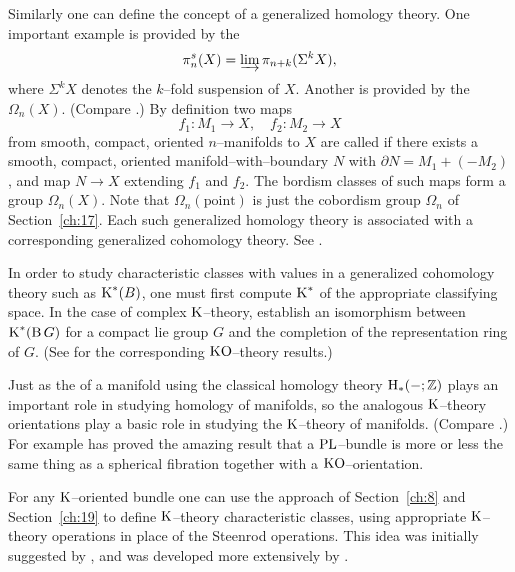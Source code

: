 \documentclass[../main]{subfiles}
\begin{document}
Similarly one can define the concept of a generalized homology theory. One important example is provided by the  \[\pi_n^s(X) = \varinjlim \pi_{n + k}(\Sigma^k X),\] where $\Sigma^k X$ denotes the $k$--fold suspension of $X$. Another is provided by the  $\Omega_n(X)$. (Compare \cite{connerfloyd}.) By definition two maps \[f_1 : M_1 \longrightarrow X, \quad f_2 : M_2 \longrightarrow X\] from smooth, compact, oriented $n$--manifolds to $X$ are called  if there exists a smooth, compact, oriented manifold--with--boundary $N$ with \newline $\partial N = M_1 + (-M_2)$, and map $N \longrightarrow X$ extending $f_1$ and $f_2$. The bordism classes of such maps form a group $\Omega_n(X)$. Note that $\Omega_n(\text{point})$ is just the cobordism group $\Omega_n$ of Section~\ref{ch:17}. Each such generalized homology theory is associated with a corresponding generalized cohomology theory. See \cite{whitehead}. 

In order to study characteristic classes with values in a generalized cohomology theory such as $\operatorname{K}^\ast(B)$, one must first compute $\operatorname{K}^\ast$ of the appropriate classifying space. In the case of complex $\operatorname{K}$--theory, \cite{atiyah1961} establish an isomorphism between $\operatorname{K}^\ast(\operatorname{B}G)$ for a compact lie group $G$ and the completion of the representation ring of $G$. (See \cite{anderson1964} for the corresponding $\operatorname{KO}$--theory results.) 

Just as the  of a manifold using the classical homology theory $\operatorname{H}_\ast(-; \mathbb Z)$ plays an important role in studying homology of manifolds, so the analogous $\operatorname{K}$--theory orientations play a basic role in studying the $\operatorname{K}$--theory of manifolds. (Compare \cite{shih1965}.) For example \cite{sullivan_2006} has proved the amazing result that a $\operatorname{PL}$--bundle is more or less the same thing as a spherical fibration together with a $\operatorname{KO}$--orientation. 

For any $\operatorname{K}$--oriented bundle one can use the approach of Section~\ref{ch:8} and Section~\ref{ch:19} to define $\operatorname{K}$--theory characteristic classes, using appropriate $\operatorname{K}$--theory operations in place of the Steenrod operations. This idea was initially suggested by \cite{bott1962}, and was developed more extensively by \cite{adams1965}.  
\end{document}
